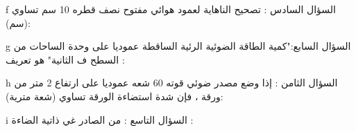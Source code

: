 \documentclass[a4paper]{article}
\begin{document}
\begin{examcopy}
\begin{multicols}{3}
  \begin{Arabic}\begin{question}{f}
السؤال السادس : تصحيح الناهاية لعمود هوائي مفتوح نصف قطره 10 سم تساوي (سم):
    \columnseprule=0pt\begin{multicols}{2}
    \begin{choices}[o]
    \end{choices}
    \end{multicols}
  \end{question}\end{Arabic}
  
 \begin{Arabic}\begin{question}{g}
السؤال السابع:"كمية الطاقة الضوئية الرئية الساقطة عموديا على وحدة الساحات من السطح ف الثانية" هو تعريف :‬
    \begin{choices}
    \end{choices}
  \end{question}\end{Arabic}
  


  \begin{Arabic}\begin{question}{h}
السؤال الثامن : إذا وضع مصدر ضوئي قوته 60 شعه عموديا على ارتفاع 2 متر من ورقة ، فإن شدة استضاءة الورقة تساوي (شعة مترية):
    \columnseprule=0pt\begin{multicols}{2}
    \begin{choices}[o]
    \end{choices}
    \end{multicols}
  \end{question}\end{Arabic}
  

   \begin{Arabic}\begin{question}{i}
السؤال التاسع : من الصادر غي ذاتية الضاءة :
    \columnseprule=0pt\begin{multicols}{2}
    \begin{choices}
    \end{choices}
    \end{multicols}
  \end{question}\end{Arabic}


\end{multicols}  

\end{examcopy}
\end{document}
